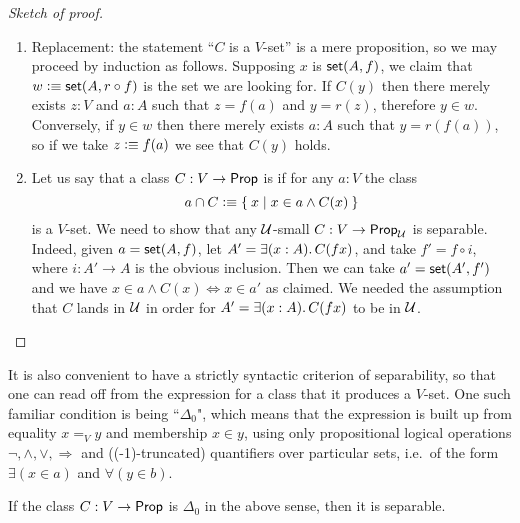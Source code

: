 \begin{proof}[Sketch of proof]
\begin{enumerate}
  \item Replacement: the statement ``$C$ is a $V$-set'' is a mere proposition, so we may
    proceed by induction as follows. Supposing $x$ is $\mathsf{set}(A, f)$, we claim that $w
    \vcentcolon\equiv \mathsf{set}(A, r \circ f)$ is the set we are looking for.  If $C(y)$ then there merely exists
    $z : V$ and $a : A$ such that $z = f(a)$ and $y = r(z)$, therefore $y \in w$.
    Conversely, if $y \in w$ then there merely exists $a : A$ such that $y = r(f(a))$, so
    if we take $z \vcentcolon\equiv f(a)$ we see that $C(y)$ holds.

\item Let us say that a class $C: V\to\mathsf{Prop}$ is  if for any $a:V$ the class
  \begin{equation*}
    a \cap C \vcentcolon\equiv\Set{x | x\in a \wedge C(x)}
  \end{equation*}
  is a $V$-set.
We need to show that any $\mathcal{U}$-small  $C: V \to \mathsf{Prop}_\mathcal{U}$ is separable. Indeed, given $a=\mathsf{set}(A,f)$, let $A' = \exis{x:A}C(fx)$, and take $f' = f\circ i$, where $i : A' \to A$ is the obvious inclusion.  Then we can take $a' = \mathsf{set}(A',f')$ and we have $x\in a\wedge C(x) \Leftrightarrow x\in a'$ as claimed.  We needed the assumption that $C$ lands in $\mathcal{U}$ in order for $A' = \exis{x:A}C(fx)$ to be in $\mathcal{U}$.\qedhere
\end{enumerate}
\end{proof}

It is also convenient to have a strictly syntactic criterion of separability, so that one can read off from the expression for a class that it produces a $V$-set.  One such familiar condition is being ``$\Delta_0$", which means that the expression is built up from equality $x=_V y$ and membership $x\in y$, using only propositional logical operations $\neg, \land, \lor, \Rightarrow$ and ((-1)-truncated) quantifiers over particular sets, i.e.\ of the form $\exists(x\in a)$ and $\forall(y\in b)$.  

\begin{cor}\label{cor:Delta0sep}
If the class $C: V \to \mathsf{Prop}$ is $\Delta_0$ in the above sense, then it is separable.
\end{cor}

